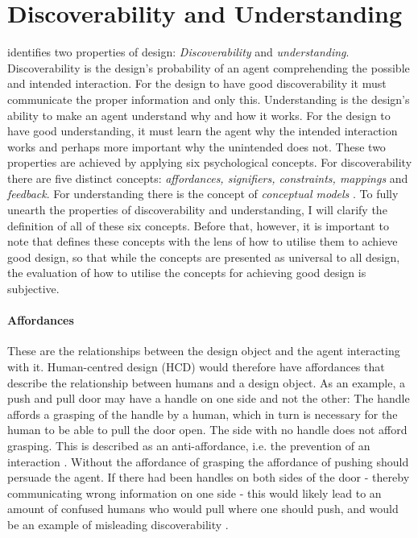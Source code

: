 \section{Discoverability and Understanding}
 identifies two properties of design: \textit{Discoverability} and \textit{understanding}. Discoverability is the design's probability of an agent comprehending the possible and intended interaction. For the design to have good discoverability it must communicate the proper information and only this. Understanding is the design's ability to make an agent understand why and how it works. For the design to have good understanding, it must learn the agent why the intended interaction works and perhaps more important why the unintended does not. These two properties are achieved by applying six psychological concepts. For discoverability there are five distinct concepts: \textit{affordances, signifiers, constraints, mappings} and \textit{feedback}. For understanding there is the concept of \textit{conceptual models} \cite{norman}. To fully unearth the properties of discoverability and understanding, I will clarify the definition of all of these six concepts. Before that, however, it is important to note that  defines these concepts with the lens of how to utilise them to achieve good design, so that while the concepts are presented as universal to all design, the evaluation of how to utilise the concepts for achieving good design is subjective.

\paragraph{Affordances} These are the relationships between the design object and the agent interacting with it. Human-centred design (HCD) would therefore have affordances that describe the relationship between humans and a design object. As an example, a push and pull door may have a handle on one side and not the other: The handle affords a grasping of the handle by a human, which in turn is necessary for the human to be able to pull the door open. The side with no handle does not afford grasping. This is described as an anti-affordance, i.e. the prevention of an interaction \cite{norman}. Without the affordance of grasping the affordance of pushing should persuade the agent. If there had been handles on both sides of the door - thereby communicating wrong information on one side - this would likely lead to an amount of confused humans who would pull where one should push, and would be an example of misleading discoverability \cite{norman}.

